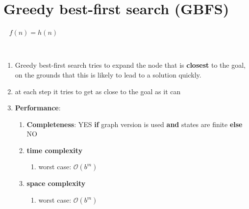 \section{Greedy best-first search (GBFS) \cite{ai/book/Artificial-Intelligence-A-Modern-Approach/Russell-Norvig}}
\label{AI: Algorithms/Greedy best-first search (GBFS)}

\ \hfill
$f(n) = h(n)$
\hfill \cite{ai/book/Artificial-Intelligence-A-Modern-Approach/Russell-Norvig}

\ \\

\begin{enumerate}[itemsep=0.2cm]
    \item Greedy best-first search tries to expand the node that is \textbf{closest} to the goal, on the grounds that this is likely to lead to a solution quickly.
    \hfill \cite{ai/book/Artificial-Intelligence-A-Modern-Approach/Russell-Norvig}

    \item at each step it tries to get as close to the goal as it can
    \hfill \cite{ai/book/Artificial-Intelligence-A-Modern-Approach/Russell-Norvig}

    \item \textbf{Performance}:
    \begin{enumerate}
        \item \textbf{Completeness}: YES \textbf{if} graph version is used \textbf{and} states are finite \textbf{else} NO
        \hfill \cite{ai/book/Artificial-Intelligence-A-Modern-Approach/Russell-Norvig}

        \item \textbf{time complexity}
        \begin{enumerate}
            \item worst case: $\mathcal{O}(b^m)$
            \hfill \cite{ai/book/Artificial-Intelligence-A-Modern-Approach/Russell-Norvig}
        \end{enumerate}

        \item \textbf{space complexity}
        \begin{enumerate}
            \item worst case: $\mathcal{O}(b^m)$
            \hfill \cite{ai/book/Artificial-Intelligence-A-Modern-Approach/Russell-Norvig}
        \end{enumerate}
    \end{enumerate}
\end{enumerate}




